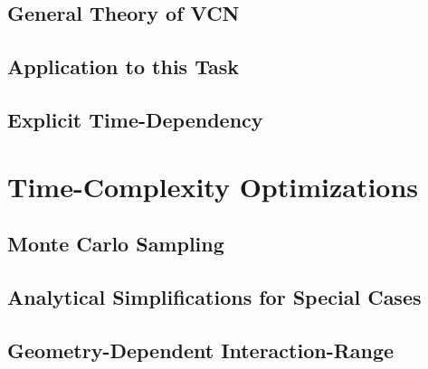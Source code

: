 \documentclass[
headings=optiontohead,              %
12pt,                               %
DIV=13,                             %
twoside=false,                      %
open=right,                         %
BCOR=00mm,                          %
toc=bibliographynumbered            %
]{scrreport}
\begin{document}
        \subsection{General Theory of VCN}
        \label{sec:theory-variational-classical-networks-basics}
        
        \FloatBarrier


        \subsection{Application to this Task}
        \label{sec:theory-variational-classical-networks-application}
        
        \FloatBarrier

        
        \subsection{Explicit Time-Dependency}
        \label{sec:theory-variational-classical-networks-time-dependency}
        
        \FloatBarrier


    \section{Time-Complexity Optimizations}
    \label{sec:theory-optimizations}
    
    \FloatBarrier

        \subsection{Monte Carlo Sampling}
        \label{sec:theory-optimizations-monte-carlo}
        
        \FloatBarrier

        \subsection{Analytical Simplifications for Special Cases}
        \label{sec:theory-optimizations-analytical}
        
        \FloatBarrier

        \subsection{Geometry-Dependent Interaction-Range}
        \label{sec:theory-optimizations-geometry}
        
        \FloatBarrier
        
\end{document}
